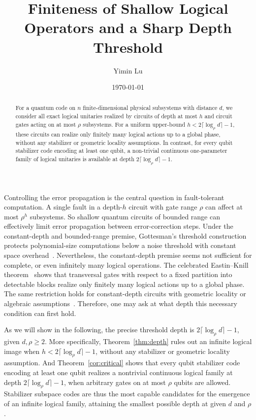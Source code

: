 \documentclass[aps,prl,reprint,notitlepage,nofootinbib,nobibnotes]{revtex4-2}
\begin{document}
\title{Finiteness of Shallow Logical Operators and a Sharp Depth Threshold}
\author{Yimin Lu}
\date{\today}

\begin{abstract}
For a quantum code on $n$ finite-dimensional physical subsystems with distance $d$, we
consider all exact logical unitaries realized by circuits of depth at most $h$ and circuit
gates acting on at most $\rho$ subsystems. For a uniform upper-bound $h<2\lceil\log_{\rho} d\rceil-1$, these circuits can realize only finitely many logical actions up to a global
phase, without any stabilizer or geometric locality assumptions. In contrast, for every qubit stabilizer code encoding at least one qubit, a non-trivial continuous one-parameter family of logical unitaries is available at depth
$2\lceil\log_{\rho} d\rceil-1$.
\end{abstract}
\maketitle

Controlling the error propagation is the central question in
fault-tolerant computation. A single fault in a
depth-\(h\) circuit with gate range \(\rho\) can affect at most \(\rho^h\) subsystems. So shallow quantum
circuits of bounded range can effectively limit error propagation between
error-correction steps.  Under the constant-depth and bounded-range premise,
Gottesman's threshold construction protects polynomial-size
computations below a noise threshold with constant space
overhead~\cite{Gottesman}. Nevertheless, the constant-depth premise seems not sufficient for complete, or even infinitely many logical operations.
The celebrated Eastin--Knill theorem~\cite{EK} shows that transversal gates with respect to a fixed partition into detectable blocks realize only finitely many logical actions up to a global phase. The same restriction holds for constant-depth circuits with geometric locality or algebraic assumptions~\cite{BK,PY,JKY,Webster}.
Therefore, one may ask at what depth this necessary condition can first hold.


As we will show in the following, the precise threshold depth is \(2\lceil\log_{\rho} d\rceil-1\), given $d, \rho\geq 2$.
More specifically, Theorem~\ref{thm:depth} rules out an infinite logical image when
\(h<2\lceil\log_{\rho} d\rceil-1\), without any stabilizer or geometric locality
assumption. And Theorem~\ref{cor:critical} shows that every qubit stabilizer
code encoding at least one qubit realizes a nontrivial
continuous logical family at depth \(2\lceil\log_{\rho} d\rceil-1\), when
arbitrary gates on at most \(\rho\) qubits are allowed. Stabilizer subspace
codes are thus the most capable candidates for the emergence of an infinite
logical family, attaining the smallest possible depth at given \(d\)
and \(\rho\).
\end{document}
